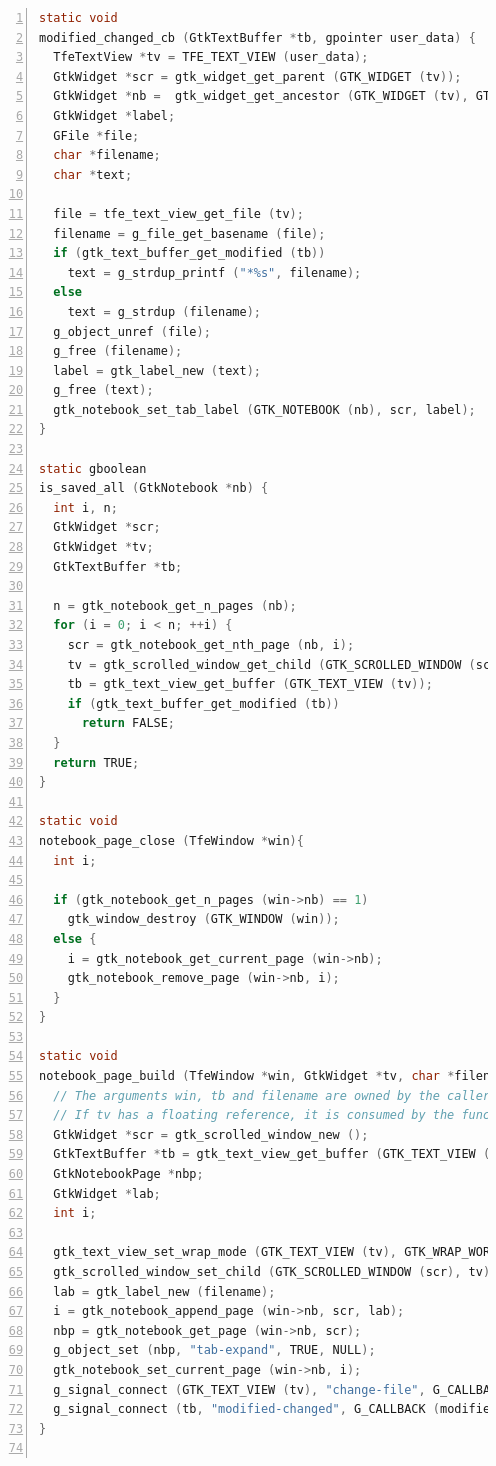 \begin{lstlisting}[language=C, numbers=left]
static void
modified_changed_cb (GtkTextBuffer *tb, gpointer user_data) {
  TfeTextView *tv = TFE_TEXT_VIEW (user_data);
  GtkWidget *scr = gtk_widget_get_parent (GTK_WIDGET (tv));
  GtkWidget *nb =  gtk_widget_get_ancestor (GTK_WIDGET (tv), GTK_TYPE_NOTEBOOK);
  GtkWidget *label;
  GFile *file;
  char *filename;
  char *text;

  file = tfe_text_view_get_file (tv);
  filename = g_file_get_basename (file);
  if (gtk_text_buffer_get_modified (tb))
    text = g_strdup_printf ("*%s", filename);
  else
    text = g_strdup (filename);
  g_object_unref (file);
  g_free (filename);
  label = gtk_label_new (text);
  g_free (text);
  gtk_notebook_set_tab_label (GTK_NOTEBOOK (nb), scr, label);
}

static gboolean
is_saved_all (GtkNotebook *nb) {
  int i, n;
  GtkWidget *scr;
  GtkWidget *tv;
  GtkTextBuffer *tb;

  n = gtk_notebook_get_n_pages (nb);
  for (i = 0; i < n; ++i) {
    scr = gtk_notebook_get_nth_page (nb, i);
    tv = gtk_scrolled_window_get_child (GTK_SCROLLED_WINDOW (scr));
    tb = gtk_text_view_get_buffer (GTK_TEXT_VIEW (tv));
    if (gtk_text_buffer_get_modified (tb))
      return FALSE;
  }
  return TRUE;
}

static void
notebook_page_close (TfeWindow *win){
  int i;

  if (gtk_notebook_get_n_pages (win->nb) == 1)
    gtk_window_destroy (GTK_WINDOW (win));
  else {
    i = gtk_notebook_get_current_page (win->nb);
    gtk_notebook_remove_page (win->nb, i);
  }
}

static void
notebook_page_build (TfeWindow *win, GtkWidget *tv, char *filename) {
  // The arguments win, tb and filename are owned by the caller.
  // If tv has a floating reference, it is consumed by the function.
  GtkWidget *scr = gtk_scrolled_window_new ();
  GtkTextBuffer *tb = gtk_text_view_get_buffer (GTK_TEXT_VIEW (tv));
  GtkNotebookPage *nbp;
  GtkWidget *lab;
  int i;

  gtk_text_view_set_wrap_mode (GTK_TEXT_VIEW (tv), GTK_WRAP_WORD_CHAR);
  gtk_scrolled_window_set_child (GTK_SCROLLED_WINDOW (scr), tv);
  lab = gtk_label_new (filename);
  i = gtk_notebook_append_page (win->nb, scr, lab);
  nbp = gtk_notebook_get_page (win->nb, scr);
  g_object_set (nbp, "tab-expand", TRUE, NULL);
  gtk_notebook_set_current_page (win->nb, i);
  g_signal_connect (GTK_TEXT_VIEW (tv), "change-file", G_CALLBACK (file_changed_cb), win->nb);
  g_signal_connect (tb, "modified-changed", G_CALLBACK (modified_changed_cb), tv);
}


\end{lstlisting}
